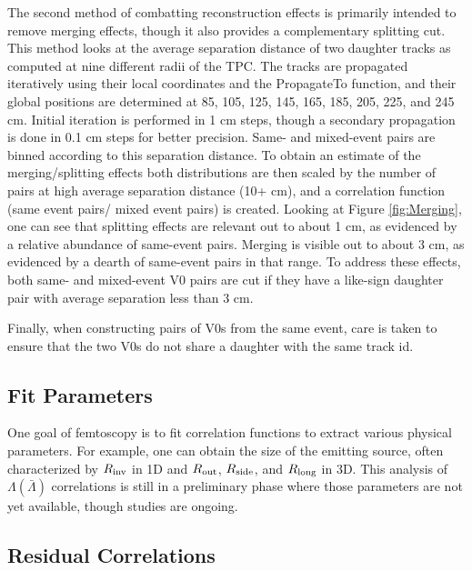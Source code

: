 The second method of combatting reconstruction effects is primarily intended to remove merging effects, though it also provides a complementary splitting cut.  This method looks at the average separation distance of two daughter tracks as computed at nine different radii of the TPC.  The tracks are propagated iteratively using their local coordinates and the PropagateTo function, and their global positions are determined at 85, 105, 125, 145, 165, 185, 205, 225, and 245 cm.  Initial iteration is performed in 1 cm steps, though a secondary propagation is done in 0.1 cm steps for better precision.  Same- and mixed-event pairs are binned according to this separation distance.  To obtain an estimate of the merging/splitting effects both distributions are then scaled by the number of pairs at high average separation distance (10+ cm), and a correlation function (same event pairs/ mixed event pairs) is created.  Looking at Figure \ref{fig:Merging}, one can see that splitting effects are relevant out to about 1 cm, as evidenced by a relative abundance of same-event pairs.  Merging is visible out to about 3 cm, as evidenced by a dearth of same-event pairs in that range.  To address these effects, both same- and mixed-event V0 pairs are cut if they have a like-sign daughter pair with average separation less than 3 cm.

Finally, when constructing pairs of V0s from the same event, care is taken to ensure that the two V0s do not share a daughter with the same track id. 

\subsection{Fit Parameters}
\label{sec:Parameters}

One goal of femtoscopy is to fit correlation functions to extract various physical parameters.  For example, one can obtain the size of the emitting source, often characterized by $R_{\rm inv}$ in 1D and $R_{\rm out}$, $R_{\rm side}$, and $R_{\rm long}$ in 3D.  This analysis of $\Lambda(\bar{\Lambda})$ correlations is still in a preliminary phase where those parameters are not yet available, though studies are ongoing.  

\subsection{Residual Correlations}
\label{sec:Residual}

